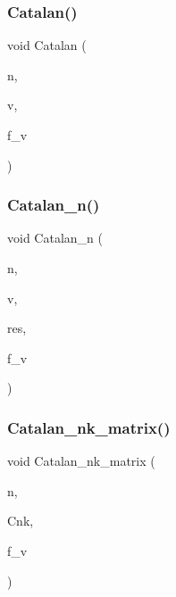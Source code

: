 \mbox{\label{global_8_c_ad9eee4ea98d4aa7e32e7ea47229fb92e}} 
\subsubsection{\texorpdfstring{Catalan()}{Catalan()}}
{\footnotesize\ttfamily void Catalan (\begin{DoxyParamCaption}\item[{\mbox{\hyperlink{galois_8h_a09fddde158a3a20bd2dcadb609de11dc}{I\+NT}}}]{n,  }\item[{\mbox{\hyperlink{class_vector}{Vector}} \&}]{v,  }\item[{\mbox{\hyperlink{galois_8h_a09fddde158a3a20bd2dcadb609de11dc}{I\+NT}}}]{f\+\_\+v }\end{DoxyParamCaption})}

\mbox{\label{global_8_c_aba8c5809d21a80e32d11a34ca84d042f}} 
\subsubsection{\texorpdfstring{Catalan\+\_\+n()}{Catalan\_n()}}
{\footnotesize\ttfamily void Catalan\+\_\+n (\begin{DoxyParamCaption}\item[{\mbox{\hyperlink{galois_8h_a09fddde158a3a20bd2dcadb609de11dc}{I\+NT}}}]{n,  }\item[{\mbox{\hyperlink{class_vector}{Vector}} \&}]{v,  }\item[{\mbox{\hyperlink{classdiscreta__base}{discreta\+\_\+base}} \&}]{res,  }\item[{\mbox{\hyperlink{galois_8h_a09fddde158a3a20bd2dcadb609de11dc}{I\+NT}}}]{f\+\_\+v }\end{DoxyParamCaption})}

\mbox{\label{global_8_c_aad966cb2e1d574fc0e513d692c1f49c6}} 
\subsubsection{\texorpdfstring{Catalan\+\_\+nk\+\_\+matrix()}{Catalan\_nk\_matrix()}}
{\footnotesize\ttfamily void Catalan\+\_\+nk\+\_\+matrix (\begin{DoxyParamCaption}\item[{\mbox{\hyperlink{galois_8h_a09fddde158a3a20bd2dcadb609de11dc}{I\+NT}}}]{n,  }\item[{\mbox{\hyperlink{classmatrix}{matrix}} \&}]{Cnk,  }\item[{\mbox{\hyperlink{galois_8h_a09fddde158a3a20bd2dcadb609de11dc}{I\+NT}}}]{f\+\_\+v }\end{DoxyParamCaption})}

